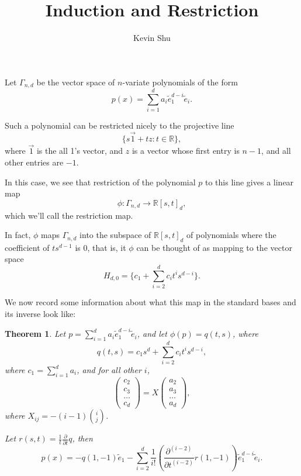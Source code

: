 \documentclass[a4paper]{article}
\author{Kevin Shu}
\title{Induction and Restriction}
\newtheorem{theorem}{Theorem}
\newcommand{\R}{\mathbb{R}}
\newcommand{\emean}{{\tilde{e}}}
\begin{document}
Let $\Gamma_{n,d}$ be the vector space of $n$-variate polynomials of the form
\[
    p(x) = \sum_{i=1}^d a_i \emean_1^{d-i} \emean_i.
\]

Such a polynomial can be restricted nicely to the projective line
\[
    \{s\vec{1} + t z : t \in \R\},
\]
where $\vec{1}$ is the all 1's vector, and $z$ is a vector whose first entry is $n-1$, and all other entries are $-1$.

In this case, we see that restriction of the polynomial $p$ to this line gives a linear map
\[
    \phi : \Gamma_{n,d} \rightarrow \R[s, t]_d,
\]
which we'll call the restriction map.

In fact, $\phi$ maps $\Gamma_{n,d}$ into the subspace of $\R[s,t]_d$ of polynomials where the coefficient of $ts^{d-1}$ is 0, that is, it $\phi$ can be thought of as mapping to the vector space
\[
    H_{d, 0} = \{c_1 + \sum_{i=2}^d c_i t^{i}s^{d-i}\}.
\]

We now record some information about what this map in the standard bases and its inverse look like:
\begin{theorem}
    Let $p = \sum_{i=1}^d a_i \emean_1^{d-i} \emean_i$, 
    and let $\phi(p) = q(t,s)$, where 
    \[
        q(t,s) = c_1s^d + \sum_{i=2}^d c_i t^{i}s^{d-i},
    \]
    where $c_1 = \sum_{i=1}^d a_i$, and for all other $i$,
    \[
        \begin{pmatrix}
            c_2\\
            c_3\\
            \dots\\
            c_d
        \end{pmatrix}
        = X
        \begin{pmatrix}
            a_2\\
            a_3\\
            \dots\\
            a_d
        \end{pmatrix},
    \]
    where $X_{ij} = -(i-1)\binom{i}{j}$.

    Let $r(s,t) = \frac{1}{t}\frac{\partial}{\partial t} q$, then 
    \[
        p(x) = -q(1, -1)\tilde{e}_1 - \sum_{i=2}^d \frac{1}{i!}\left(\frac{\partial^{(i-2)}}{\partial t^{(i-2)}}r(1,-1)  \right) \emean_1^{d-i}\emean_i.
    \]
\end{theorem}
\end{document}
